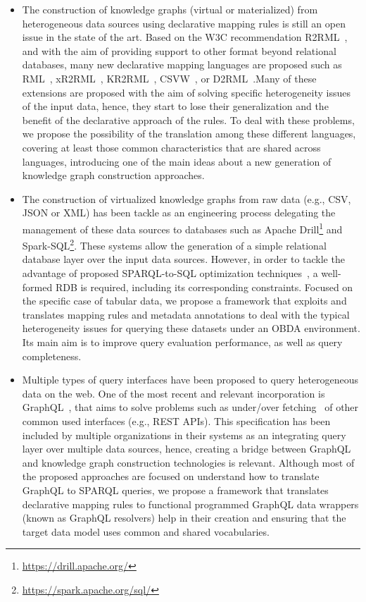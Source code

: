 \begin{itemize}
    \item The construction of knowledge graphs (virtual or materialized) from heterogeneous data sources using declarative mapping rules is still an open issue in the state of the art. Based on the W3C recommendation R2RML~\citep{R2RML}, and with the aim of providing support to other format beyond relational databases, many new declarative mapping languages are proposed such as RML~\citep{dimou2014rml}, xR2RML~\citep{michel2015translation}, KR2RML~\citep{slepicka2015kr2rml}, CSVW~\citep{tennison2015model}, or D2RML~\citep{chortaras2018mapping}.Many of these extensions are proposed with the aim of solving specific heterogeneity issues of the input data, hence, they start to lose their generalization and the benefit of the declarative approach of the rules. To deal with these problems, we propose the possibility of the translation among these different languages, covering at least those common characteristics that are shared across languages, introducing one of the main ideas about a new generation of knowledge graph construction approaches.
    \item The construction of virtualized knowledge graphs from raw data (e.g., CSV, JSON or XML) has been tackle as an engineering process delegating the management of these data sources to databases such as Apache Drill\footnote{\url{https://drill.apache.org/}} and Spark-SQL\footnote{\url{https://spark.apache.org/sql/}}. These systems allow the generation of a simple relational database layer over the input data sources. However, in order to tackle the advantage of proposed SPARQL-to-SQL optimization techniques~\citep{priyatna2014formalisation,calvanese2017ontop}, a well-formed RDB is required, including its corresponding constraints. Focused on the specific case of tabular data, we propose a framework that exploits and translates mapping rules and metadata annotations to deal with the typical heterogeneity issues for querying these datasets under an OBDA environment. Its main aim is to improve query evaluation performance, as well as query completeness.
    \item Multiple types of query interfaces have been proposed to query heterogeneous data on the web. One of the most recent and relevant incorporation is GraphQL~\citep{graphql}, that aims to solve problems such as under/over fetching~\citep{bryant2017graphql,vogel2017experiences,mukhiya2019graphql} of other common used interfaces (e.g., REST APIs). This specification has been included by multiple organizations in their systems as an integrating query layer over multiple data sources, hence, creating a bridge between GraphQL and knowledge graph construction technologies is relevant. Although most of the proposed approaches are focused on understand how to translate GraphQL to SPARQL queries, we propose a framework that translates declarative mapping rules to functional programmed GraphQL data wrappers (known as GraphQL resolvers) help in their creation and ensuring that the target data model uses common and shared vocabularies.
    \end{itemize}


